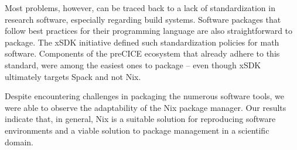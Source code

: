 \documentclass{eceasst}
\begin{document}
Most problems, however, can be traced back to a lack of standardization in research software, especially regarding build systems.
Software packages that follow best practices for their programming language are also straightforward to package.
The xSDK initiative defined such standardization policies for math software. Components of the preCICE ecosystem that already adhere to this standard, were among the easiest ones to package -- even though xSDK ultimately targets Spack and not Nix.

Despite encountering challenges in packaging the numerous software tools, we were able to observe the adaptability of the Nix package manager.
Our results indicate that, in general, Nix is a suitable solution for reproducing software environments and a viable solution to package management in a scientific domain.





\end{document}
